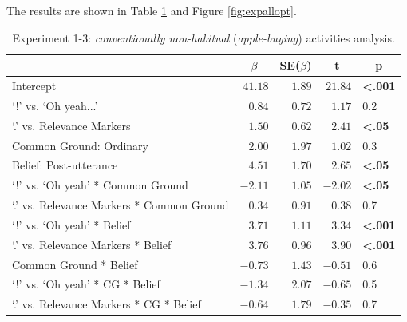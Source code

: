 \documentclass{sp}\usepackage[]{graphicx}\usepackage[]{color}
\begin{document}
The results are shown in Table \ref{tab:expallopt} and Figure \ref{fig:expallopt}.

\begin{table}[!tbp]
\caption{Experiment 1-3: \textit{conventionally non-habitual} (\textit{apple-buying}) activities analysis.\label{tab:expallopt}} 
\begin{center}
\begin{tabular}{lrrrl}
\toprule
\multicolumn{1}{l}{}&\multicolumn{1}{c}{$\beta$}&\multicolumn{1}{c}{SE($\beta$)}&\multicolumn{1}{c}{\textbf{t}}&\multicolumn{1}{c}{\textbf{p}}\tabularnewline
\midrule
Intercept&$41.18$&$1.89$&$21.84$&\textbf{\textless .001}\tabularnewline
`!' vs. `Oh yeah...'&$ 0.84$&$0.72$&$ 1.17$&0.2\tabularnewline
`.' vs. Relevance Markers&$ 1.50$&$0.62$&$ 2.41$&\textbf{\textless .05}\tabularnewline
Common Ground: Ordinary&$ 2.00$&$1.97$&$ 1.02$&0.3\tabularnewline
Belief: Post-utterance&$ 4.51$&$1.70$&$ 2.65$&\textbf{\textless .05}\tabularnewline
`!' vs. `Oh yeah' * Common Ground&$-2.11$&$1.05$&$-2.02$&\textbf{\textless .05}\tabularnewline
`.' vs. Relevance Markers * Common Ground&$ 0.34$&$0.91$&$ 0.38$&0.7\tabularnewline
`!' vs. `Oh yeah' * Belief&$ 3.71$&$1.11$&$ 3.34$&\textbf{\textless .001}\tabularnewline
`.' vs. Relevance Markers * Belief&$ 3.76$&$0.96$&$ 3.90$&\textbf{\textless .001}\tabularnewline
Common Ground * Belief&$-0.73$&$1.43$&$-0.51$&0.6\tabularnewline
`!' vs. `Oh yeah' * CG * Belief&$-1.34$&$2.07$&$-0.65$&0.5\tabularnewline
`.' vs. Relevance Markers * CG * Belief&$-0.64$&$1.79$&$-0.35$&0.7\tabularnewline
\bottomrule
\end{tabular}\end{center}
\end{table}
\end{document}
